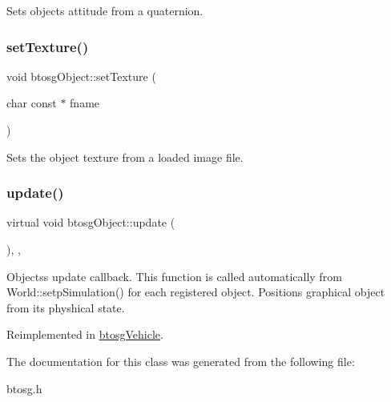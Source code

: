 Sets objects attitude from a quaternion. \mbox{\label{classbtosgObject_aff54acbc7c66811efb0cf2838107a241}} 
\subsubsection{\texorpdfstring{set\+Texture()}{setTexture()}}
{\footnotesize\ttfamily void btosg\+Object\+::set\+Texture (\begin{DoxyParamCaption}\item[{char const $\ast$}]{fname }\end{DoxyParamCaption})\hspace{0.3cm}{\ttfamily [inherited]}}

Sets the object texture from a loaded image file. \mbox{\label{classbtosgObject_a342917817dfde62554f83da8e0d5110b}} 
\subsubsection{\texorpdfstring{update()}{update()}}
{\footnotesize\ttfamily virtual void btosg\+Object\+::update (\begin{DoxyParamCaption}{ }\end{DoxyParamCaption})\hspace{0.3cm}{\ttfamily [inline]}, {\ttfamily [virtual]}, {\ttfamily [inherited]}}

Objects\textquotesingle{}s update callback. This function is called automatically from World\+::setp\+Simulation() for each registered object. Positions graphical object from its physhical state. 

Reimplemented in \hyperlink{classbtosgVehicle_a5fd0f471df492ac232c9b772a28bd2b9}{btosg\+Vehicle}.



The documentation for this class was generated from the following file\+:\begin{DoxyCompactItemize}
\item 
btosg.\+h\end{DoxyCompactItemize}
